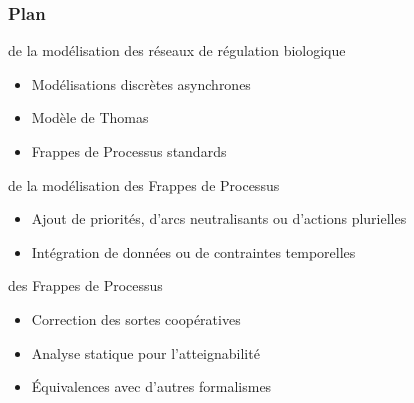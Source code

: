 \begin{frame}[c]
\frametitle{Plan}

 de la modélisation des réseaux de régulation biologique
\begin{itemize}
  \item Modélisations discrètes asynchrones
  \item Modèle de Thomas
  \item Frappes de Processus standards
\end{itemize}

\pause
\bigskip
{} de la modélisation des Frappes de Processus
\begin{itemize}
  \item Ajout de priorités, d'arcs neutralisants ou d'actions plurielles
  \item Intégration de données ou de contraintes temporelles
\end{itemize}

\pause
\bigskip
{} des Frappes de Processus
\begin{itemize}
  \item Correction des sortes coopératives
  \item Analyse statique pour l'atteignabilité
  \item Équivalences avec d'autres formalismes
\end{itemize}

\end{frame}
